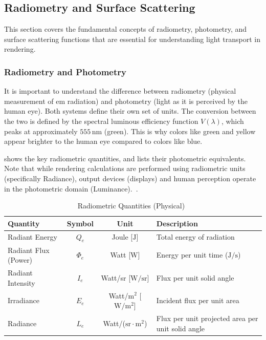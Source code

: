 \subsection{Radiometry and Surface Scattering}\label{subsec:radiometry-surface-reflectance}

This section covers the fundamental concepts of radiometry, photometry, and surface scattering functions 
that are essential for understanding light transport in rendering.

\subsubsection{Radiometry and Photometry}\label{subsubsec:radiometry-photometry}

It is important to understand the difference between radiometry (physical measurement of \gls{em} radiation)
and photometry (light as it is perceived by the human eye).
Both systems define their own set of units.
The conversion between the two is defined by the spectral luminous efficiency function $V(\lambda)$,
which peaks at approximately $555\,\mathrm{nm}$ (green).
This is why colors like green and yellow appear brighter to the human eye compared to colors like blue.

 shows the key radiometric quantities,
and  lists their photometric equivalents.
Note that while rendering calculations are performed using radiometric units (specifically Radiance),
output devices (displays) and human perception operate in the photometric domain (Luminance).~\cite{tuwien_rendering_2020}.

\begin{table}
    \centering
    \caption{Radiometric Quantities (Physical)~\cite{tuwien_rendering_2020}}
    \label{tab:radiometric-quantities}
    \begin{tabular}{lccl}
        \toprule
        \textbf{Quantity} & \textbf{Symbol} & \textbf{Unit} & \textbf{Description} \\
        \midrule
        Radiant Energy & $Q_e$ & Joule [$\mathrm{J}$] & Total energy of radiation \\
        Radiant Flux (Power) & $\Phi_e$ & Watt [$\mathrm{W}$] & Energy per unit time ($\mathrm{J/s}$) \\
        Radiant Intensity & $I_e$ & Watt/sr [$\mathrm{W/sr}$] & Flux per unit solid angle \\
        Irradiance & $E_e$ & Watt/$\mathrm{m}^2$ [$\mathrm{W/m^2}$] & Incident flux per unit area \\
        Radiance & $L_e$ & Watt/($\mathrm{sr} \cdot \mathrm{m}^2$) & Flux per unit projected area per unit solid angle \\
        \bottomrule
    \end{tabular}
\end{table}

